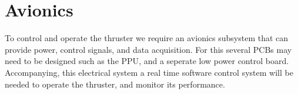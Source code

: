 \section{Avionics}

To control and operate the thruster we require an avionics subsystem that can provide power, control signals, and data acquisition. For this several \ac{PCB}s may need to be designed such as the \ac{PPU}, and a seperate low power control board. Accompanying, this electrical system a real time software control system will be needed to operate the thruster, and monitor its performance. 




